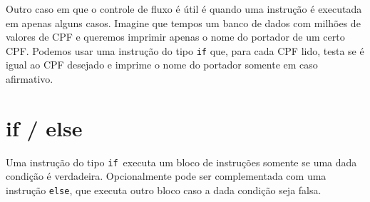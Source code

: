 \documentclass{book}
\newcommand{\IF}{{\tt if}}
\newcommand{\ELSE}{{\tt else}}
\begin{document}
Outro caso em que o controle de fluxo é útil é quando uma instrução é executada em apenas alguns casos. Imagine que tempos um banco de dados com milhões de valores de CPF e queremos imprimir apenas o nome do portador de um certo CPF. Podemos usar uma instrução do tipo {\tt if} que, para cada CPF lido, testa se é igual ao CPF desejado e imprime o nome do portador somente em caso afirmativo.


\section{if / else}

Uma instrução do tipo \IF\ executa um bloco de instruções somente se uma dada condição é verdadeira. Opcionalmente pode ser complementada com uma instrução \ELSE, que executa outro bloco caso a dada condição seja falsa.
\end{document}
